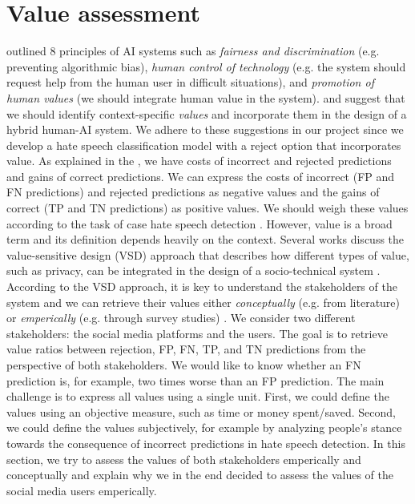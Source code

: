 \section{Value assessment}
\label{sec:related-work-value-assessment}
\citet{fjeld2020principled} outlined 8 principles of AI systems such as \emph{fairness and discrimination} (e.g. preventing algorithmic bias), \emph{human control of technology} (e.g. the system should request help from the human user in difficult situations), and \emph{promotion of human values} (we should integrate human value in the system).
%
\citet{sayin2021science} and \citet{casati2021value} suggest that we should identify context-specific \emph{values} and incorporate them in the design of a hybrid human-AI system.
%
We adhere to these suggestions in our project since we develop a hate speech classification model with a reject option that incorporates value.
%
As explained in the , we have costs of incorrect and rejected predictions and gains of correct predictions.
%
We can express the costs of incorrect (FP and FN predictions) and rejected predictions as negative values and the gains of correct (TP and TN predictions) as positive values.
%
We should weigh these values according to the task of case hate speech detection \citep{sayin2021science}.
%
However, value is a broad term and its definition depends heavily on the context.
%
Several works discuss the value-sensitive design (VSD) approach that describes how different types of value, such as privacy, can be integrated in the design of a socio-technical system \citep{zhu2018value, umbrello2021mapping}.
%
According to the VSD approach, it is key to understand the stakeholders of the system and we can retrieve their values either \emph{conceptually} (e.g. from literature) or \emph{emperically} (e.g. through survey studies) \citep{zhu2018value, umbrello2021mapping}.
%
We consider two different stakeholders: the social media platforms and the users.
%
The goal is to retrieve value ratios between rejection, FP, FN, TP, and TN predictions from the perspective of both stakeholders.
%
We would like to know whether an FN prediction is, for example, two times worse than an FP prediction.
%
The main challenge is to express all values using a single unit.
%
First, we could define the values using an objective measure, such as time or money spent/saved.
%
Second, we could define the values subjectively, for example by analyzing people's stance towards the consequence of incorrect predictions in hate speech detection.
%
In this section, we try to assess the values of both stakeholders emperically and conceptually and explain why we in the end decided to assess the values of the social media users emperically.
%



